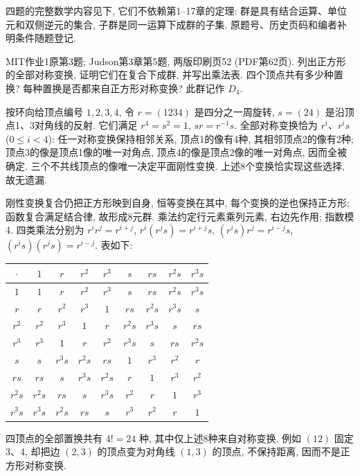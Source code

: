 \noindent 四题的完整数学内容见下, 它们不依赖第1--17章的定理: 群是具有结合运算、单位元和双侧逆元的集合, 子群是同一运算下成群的子集. 原题号、历史页码和编者补明条件随题登记.

\begin{exercise}\label{ex:judson5}
MIT作业1原第3题; Judson第3章第5题, 两版印刷页52 (PDF第62页). 列出正方形的全部对称变换, 证明它们在复合下成群, 并写出乘法表. 四个顶点共有多少种置换? 每种置换是否都来自正方形对称变换? 此群记作 $D_4$.
\end{exercise}
\begin{solution}
按环向给顶点编号 $1,2,3,4$, 令 $r=(1234)$ 是四分之一周旋转, $s=(24)$ 是沿顶点1、3对角线的反射. 它们满足 $r^4=s^2=1$, $sr=r^{-1}s$. 全部对称变换恰为 $r^i$、$r^is$ ($0\le i<4$): 任一对称变换保持相邻关系, 顶点1的像有4种, 其相邻顶点2的像有2种; 顶点3的像是顶点1像的唯一对角点, 顶点4的像是顶点2像的唯一对角点, 因而全被确定. 三个不共线顶点的像唯一决定平面刚性变换. 上述8个变换恰实现这些选择, 故无遗漏.

刚性变换复合仍把正方形映到自身, 恒等变换在其中, 每个变换的逆也保持正方形; 函数复合满足结合律, 故形成8元群. 乘法约定行元素乘列元素, 右边先作用; 指数模4. 四类乘法分别为 $r^ir^j=r^{i+j}$, $r^i(r^js)=r^{i+j}s$, $(r^is)r^j=r^{i-j}s$, $(r^is)(r^js)=r^{i-j}$. 表如下:
\begin{center}\begin{tabular}{c|cccccccc}
$\cdot$&$1$&$r$&$r^2$&$r^3$&$s$&$rs$&$r^2s$&$r^3s$\\\hline
$1$&$1$&$r$&$r^2$&$r^3$&$s$&$rs$&$r^2s$&$r^3s$\\
$r$&$r$&$r^2$&$r^3$&$1$&$rs$&$r^2s$&$r^3s$&$s$\\
$r^2$&$r^2$&$r^3$&$1$&$r$&$r^2s$&$r^3s$&$s$&$rs$\\
$r^3$&$r^3$&$1$&$r$&$r^2$&$r^3s$&$s$&$rs$&$r^2s$\\
$s$&$s$&$r^3s$&$r^2s$&$rs$&$1$&$r^3$&$r^2$&$r$\\
$rs$&$rs$&$s$&$r^3s$&$r^2s$&$r$&$1$&$r^3$&$r^2$\\
$r^2s$&$r^2s$&$rs$&$s$&$r^3s$&$r^2$&$r$&$1$&$r^3$\\
$r^3s$&$r^3s$&$r^2s$&$rs$&$s$&$r^3$&$r^2$&$r$&$1$\\
\end{tabular}\end{center}
四顶点的全部置换共有 $4!=24$ 种, 其中仅上述8种来自对称变换. 例如 $(12)$ 固定3、4, 却把边 $(2,3)$ 的顶点变为对角线 $(1,3)$ 的顶点, 不保持距离, 因而不是正方形对称变换.
\end{solution}

